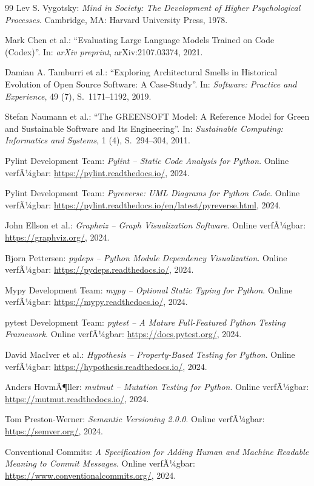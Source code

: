 ﻿\documentclass[a4paper,12pt]{article}
\begin{document}
\begin{thebibliography}{99}
	Lev S. Vygotsky:
	\textit{Mind in Society: The Development of Higher Psychological Processes}.
	Cambridge, MA: Harvard University Press, 1978.
	
	Mark Chen et al.:
	\enquote{Evaluating Large Language Models Trained on Code (Codex)}.
	In: \textit{arXiv preprint}, arXiv:2107.03374, 2021.
	
	Damian A. Tamburri et al.:
	\enquote{Exploring Architectural Smells in Historical Evolution of Open Source
		Software: A Case-Study}.
	In: \textit{Software: Practice and Experience}, 49 (7), S.~1171--1192, 2019.
	
	Stefan Naumann et al.:
	\enquote{The GREENSOFT Model: A Reference Model for Green and Sustainable Software
		and Its Engineering}.
	In: \textit{Sustainable Computing: Informatics and Systems}, 1 (4), S.~294--304, 2011.
	
	Pylint Development Team:
	\textit{Pylint -- Static Code Analysis for Python}.
	Online verfÃ¼gbar: \url{https://pylint.readthedocs.io/}, 2024.
	
	Pylint Development Team:
	\textit{Pyreverse: UML Diagrams for Python Code}.
	Online verfÃ¼gbar: \url{https://pylint.readthedocs.io/en/latest/pyreverse.html}, 2024.
	
	John Ellson et al.:
	\textit{Graphviz -- Graph Visualization Software}.
	Online verfÃ¼gbar: \url{https://graphviz.org/}, 2024.
	
	Bjorn Pettersen:
	\textit{pydeps -- Python Module Dependency Visualization}.
	Online verfÃ¼gbar: \url{https://pydeps.readthedocs.io/}, 2024.
	
	Mypy Development Team:
	\textit{mypy -- Optional Static Typing for Python}.
	Online verfÃ¼gbar: \url{https://mypy.readthedocs.io/}, 2024.
	
	pytest Development Team:
	\textit{pytest -- A Mature Full-Featured Python Testing Framework}.
	Online verfÃ¼gbar: \url{https://docs.pytest.org/}, 2024.
	
	David MacIver et al.:
	\textit{Hypothesis -- Property-Based Testing for Python}.
	Online verfÃ¼gbar: \url{https://hypothesis.readthedocs.io/}, 2024.
	
	Anders HovmÃ¶ller:
	\textit{mutmut -- Mutation Testing for Python}.
	Online verfÃ¼gbar: \url{https://mutmut.readthedocs.io/}, 2024.
	
	Tom Preston-Werner:
	\textit{Semantic Versioning 2.0.0}.
	Online verfÃ¼gbar: \url{https://semver.org/}, 2024.
	
	Conventional Commits:
	\textit{A Specification for Adding Human and Machine Readable Meaning to
		Commit Messages}.
	Online verfÃ¼gbar: \url{https://www.conventionalcommits.org/}, 2024.
	
\end{thebibliography}
	
\end{document}

